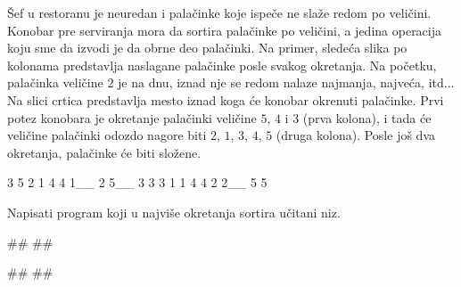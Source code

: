 \begin{Exercise}[difficulty=2, label=3-26]
  Šef u restoranu je neuredan i palačinke koje ispeče ne slaže redom
  po veličini. Konobar pre serviranja mora da sortira palačinke po
  veličini, a jedina operacija koju sme da izvodi je da obrne deo
  palačinki. Na primer, sledeća slika po kolonama predstavlja
  naslagane palačinke posle svakog okretanja. Na početku, palačinka
  veličine $2$ je na dnu, iznad nje se redom nalaze najmanja, najveća,
  itd... Na slici crtica predstavlja mesto iznad koga će konobar
  okrenuti palačinke. Prvi potez konobara je okretanje palačinki
  veličine $5$, $4$ i $3$ (prva kolona), i tada će veličine palačinki
  odozdo nagore biti $2$, $1$, $3$, $4$, $5$ (druga kolona). Posle još
  dva okretanja, palačinke će biti složene.
\begin{ckod}
    3    5    2    1
    4    4    1__  2
    5__  3    3    3
    1    1    4    4
    2    2__  5    5
\end{ckod}
Napisati program koji u najviše  okretanja sortira učitani
niz. 

\begin{maxitest}
\begin{test}{1}
#\naslovUlaz#
##

#\naslovIzlaz#
##
\end{test}
\end{maxitest}

\end{Exercise}

